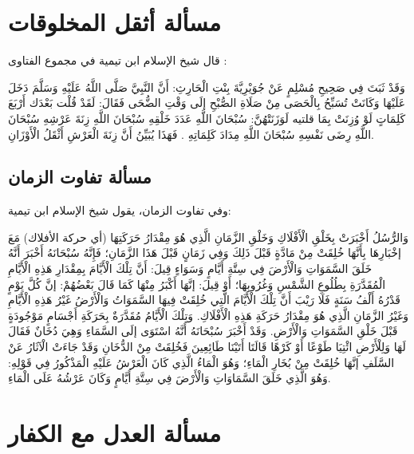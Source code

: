 \section{مسألة أثقل المخلوقات}

قال شيخ الإسلام ابن تيمية في مجموع الفتاوى \href{https://shamela.ws/book/7289/2991#p1}{\faExternalLink}:

وَقَدْ ثَبَتَ فِي صَحِيحِ مُسْلِمٍ {عَنْ جُوَيْرِيَّةَ بِنْتِ الْحَارِثِ: أَنَّ النَّبِيَّ صَلَّى اللَّهُ عَلَيْهِ وَسَلَّمَ دَخَلَ عَلَيْهَا وَكَانَتْ تُسَبِّحُ بِالْحَصَى مِنْ صَلَاةِ الصُّبْحِ إلَى وَقْتِ الضُّحَى فَقَالَ: لَقَدْ قُلْت بَعْدَك أَرْبَعَ كَلِمَاتٍ لَوْ وُزِنَتْ بِمَا قلتيه لَوَزَنَتْهُنَّ: سُبْحَانَ اللَّهِ عَدَدَ خَلْقِهِ سُبْحَانَ اللَّهِ زِنَةَ عَرْشِهِ سُبْحَانَ اللَّهِ رِضَى نَفْسِهِ سُبْحَانَ اللَّهِ مِدَادَ كَلِمَاتِهِ} . فَهَذَا يُبَيِّنُ أَنَّ زِنَةَ الْعَرْشِ أَثْقَلُ الْأَوْزَانِ.

\subsection{مسألة تفاوت الزمان}


وفي تفاوت الزمان، يقول شيخ الإسلام ابن تيمية:

وَالرُّسُلُ أَخْبَرَتْ بِخَلْقِ الْأَفْلَاكِ وَخَلْقِ الزَّمَانِ الَّذِي هُوَ مِقْدَارُ حَرَكَتِهَا (أي حركة الأفلاك) مَعَ إخْبَارِهَا بِأَنَّهَا خُلِقَتْ مِنْ مَادَّةٍ قَبْلَ ذَلِكَ وَفِي زَمَانٍ قَبْلَ هَذَا الزَّمَانِ؛ فَإِنَّهُ سُبْحَانَهُ أَخْبَرَ أَنَّهُ خَلَقَ السَّمَوَاتِ وَالْأَرْضَ فِي سِتَّةِ أَيَّامٍ وَسَوَاءٍ قِيلَ: أَنَّ تِلْكَ الْأَيَّامَ بِمِقْدَارِ هَذِهِ الْأَيَّامِ الْمُقَدَّرَةِ بِطُلُوعِ الشَّمْسِ وَغُرُوبِهَا؛ أَوْ قِيلَ: إنَّهَا أَكْبَرُ مِنْهَا كَمَا قَالَ بَعْضُهُمْ: إنَّ كُلَّ يَوْمٍ قَدْرُهُ أَلْفُ سَنَةٍ فَلَا رَيْبَ أَنَّ تِلْكَ الْأَيَّامَ الَّتِي خُلِقَتْ فِيهَا السَّمَوَاتُ وَالْأَرْضُ غَيْرُ هَذِهِ الْأَيَّامِ وَغَيْرُ الزَّمَانِ الَّذِي هُوَ مِقْدَارُ حَرَكَةِ هَذِهِ الْأَفْلَاكِ. وَتِلْكَ الْأَيَّامُ مُقَدَّرَةٌ بِحَرَكَةِ أَجْسَامٍ مَوْجُودَةٍ قَبْلَ خَلْقِ السَّمَوَاتِ وَالْأَرْضِ. وَقَدْ أَخْبَرَ سُبْحَانَهُ أَنَّهُ {اسْتَوَى إلَى السَّمَاءِ وَهِيَ دُخَانٌ فَقَالَ لَهَا وَلِلْأَرْضِ ائْتِيَا طَوْعًا أَوْ كَرْهًا قَالَتَا أَتَيْنَا طَائِعِينَ} فَخُلِقَتْ مِنْ الدُّخَانِ وَقَدْ جَاءَتْ الْآثَارُ عَنْ السَّلَفِ إنَّهَا خُلِقَتْ مِنْ بُخَارِ الْمَاءِ؛ وَهُوَ الْمَاءُ الَّذِي كَانَ الْعَرْشُ عَلَيْهِ الْمَذْكُورُ فِي قَوْلِهِ: {وَهُوَ الَّذِي خَلَقَ السَّمَاوَاتِ وَالْأَرْضَ فِي سِتَّةِ أَيَّامٍ وَكَانَ عَرْشُهُ عَلَى الْمَاءِ}.

\section{مسألة العدل مع الكفار}
\label{sec:app_justice}

